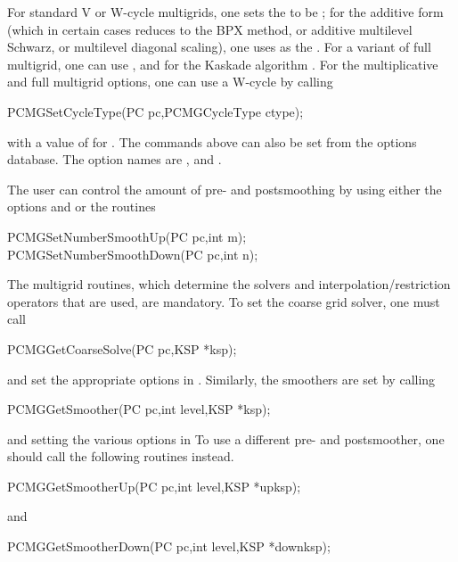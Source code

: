 For standard V or W-cycle multigrids, one sets the  to be  ; for the
additive form (which in certain cases reduces to the BPX method, or additive
multilevel Schwarz, or multilevel diagonal scaling), one uses
  as the .  For a variant
of full multigrid, one can
 use  , and for the Kaskade
algorithm  .
For the multiplicative and full multigrid options, one can use a
W-cycle by   calling
\begin{tabbing}
  PCMGSetCycleType(PC pc,PCMGCycleType ctype);
\end{tabbing}
with a value of  for .
The commands above can also be set from the options database. The option
names are ,
and  .  

The user can control the amount of pre- and postsmoothing
  by using
either the options  
  and   or
the routines
\begin{tabbing}
  PCMGSetNumberSmoothUp(PC pc,int m);\\
  PCMGSetNumberSmoothDown(PC pc,int n);
\end{tabbing}

The multigrid routines, which determine
the solvers and interpolation/restriction operators that are used,
are mandatory.
To set the coarse grid solver, one must 
call
\begin{tabbing}
  PCMGGetCoarseSolve(PC pc,KSP *ksp);
\end{tabbing}
and set the appropriate options in . Similarly, the
smoothers are set by calling
\begin{tabbing}
  PCMGGetSmoother(PC pc,int level,KSP *ksp);
\end{tabbing}
and setting the various options in 
To use a different pre- and postsmoother, one should call the following
routines instead.
\begin{tabbing}
  PCMGGetSmootherUp(PC pc,int level,KSP *upksp);
\end{tabbing}
and
\begin{tabbing}
  PCMGGetSmootherDown(PC pc,int level,KSP *downksp);
\end{tabbing}

